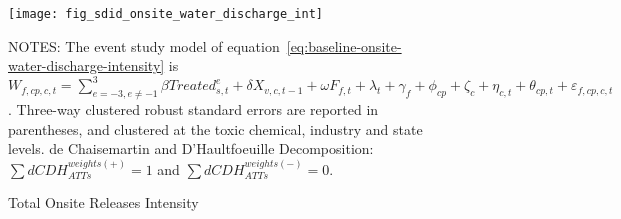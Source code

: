 \begin{figure}[H]
    \centering
    \texttt{[image: fig\_sdid\_onsite\_water\_discharge\_int]}
    \caption{Total Onsite Releases Intensity}
    \label{fig:baseline-onsite-water-discharge-intensity}
    \begin{minipage}{18cm}
        \vspace{0.05in}
        \tiny NOTES: The event study model of equation~\ref{eq:baseline-onsite-water-discharge-intensity} is $W_{f,cp,c,t} = \sum_{{e = -3},{e \neq -1}}^{3} \beta Treated_{s,t}^e + \delta X_{v,c,t-1} + \omega F_{f,t} + \lambda_{t} + \gamma_{f} + \phi_{cp} + \zeta_{c} + \eta_{c,t} + \theta_{cp,t} + \varepsilon_{f,cp,c,t}$. Three-way clustered robust standard errors are reported in parentheses, and clustered at the toxic chemical, industry and state levels. de Chaisemartin and D'Haultfoeuille Decomposition: $\sum dCDH_{ATTs}^{weights(+)} = 1$ and $\sum dCDH_{ATTs}^{weights(-)} = 0$.
    \end{minipage}
\end{figure}